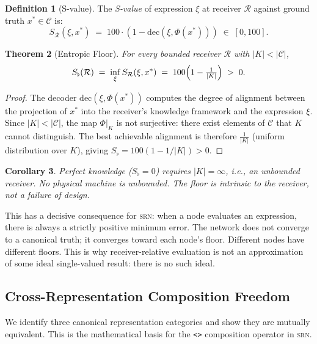 \documentclass[twocolumn,11pt,a4paper]{article}
\newtheorem{theorem}{Theorem}[section]
\newtheorem{corollary}[theorem]{Corollary}
\theoremstyle{definition}
\newtheorem{definition}[theorem]{Definition}
\theoremstyle{remark}
\newcommand{\srn}{\textsc{srn}}
\newcommand{\Recv}{\mathcal{R}}
\newcommand{\floor}{S_{\flat}}
\begin{document}
\begin{definition}[S-value]
The \emph{S-value} of expression $\xi$ at receiver $\Recv$ against
ground truth $x^* \in \mathscr{C}$ is:
\[
S_\Recv(\xi, x^*) \;=\; 100 \cdot (1 - \mathrm{dec}(\xi, \Phi(x^*)))
\;\in\; [0,100].
\]
\end{definition}

\begin{theorem}[Entropic Floor]
\label{thm:floor}
For every bounded receiver $\Recv$ with $|K| < |\mathscr{C}|$,
\[
\floor(\Recv) \;=\; \inf_{\xi} S_\Recv(\xi, x^*) \;=\;
100\Bigl(1 - \tfrac{1}{|K|}\Bigr) \;>\; 0.
\]
\end{theorem}
\begin{proof}
The decoder $\mathrm{dec}(\xi, \Phi(x^*))$ computes the degree of
alignment between the projection of $x^*$ into the receiver's knowledge
framework and the expression $\xi$.  Since $|K| < |\mathscr{C}|$, the
map $\Phi|_K$ is not surjective: there exist elements of $\mathscr{C}$
that $K$ cannot distinguish.  The best achievable alignment is therefore
$\tfrac{1}{|K|}$ (uniform distribution over $K$), giving
$\floor = 100(1 - 1/|K|) > 0$.
\end{proof}

\begin{corollary}
\label{cor:floor}
Perfect knowledge ($\floor = 0$) requires $|K| = \infty$, i.e., an
unbounded receiver.  No physical machine is unbounded.  The floor is
intrinsic to the receiver, not a failure of design.
\end{corollary}

This has a decisive consequence for \srn: when a node evaluates an
expression, there is always a strictly positive minimum error.  The
network does not converge to a canonical truth; it converges toward each
node's floor.  Different nodes have different floors.  This is why
receiver-relative evaluation is not an approximation of some ideal
single-valued result: there is no such ideal.

\subsection{Cross-Representation Composition Freedom}
\label{sec:freedom}

We identify three canonical representation categories and show they are
mutually equivalent.  This is the mathematical basis for the
\lstinline|<>| composition operator in \srn.
\end{document}
